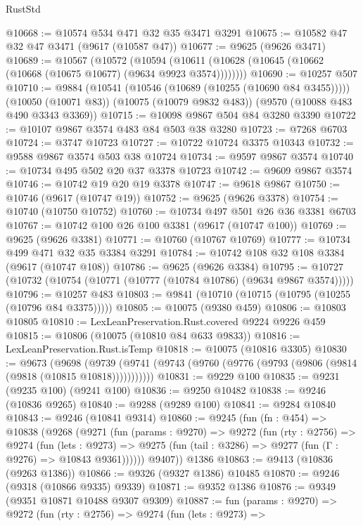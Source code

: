 \begin{lexlean}{RustStd}
\begin{coremodule}
@10668 := @10574 @534 @471 @32 @35 @3471 @3291
@10675 := @10582 @47 @32 @47 @3471 (@9617 (@10587 @47))
@10677 := @9625 (@9626 @3471)
@10689 := @10567
    (@10572
      (@10594 (@10611 (@10628 (@10645 (@10662 (@10668 (@10675 @10677) (@9634 @9923 @3574))))))))
@10690 := @10257 @507
@10710 := @9884
    (@10541 (@10546 (@10689 (@10255 (@10690 @84 @3455)))))
    (@10050 (@10071 @83))
    (@10075 (@10079 @9832 @483))
    (@9570 (@10088 @483 @490 @3343 @3369))
@10715 := @10098 @9867 @504 @84 @3280 @3390
@10722 := @10107 @9867 @3574 @483 @84 @503 @38 @3280
@10723 := @7268 @6703
@10724 := @3747 @10723
@10727 := @10722 @10724 @3375 @10343
@10732 := @9588 @9867 @3574 @503 @38 @10724
@10734 := @9597 @9867 @3574
@10740 := @10734 @495 @502 @20 @37 @3378 @10723
@10742 := @9609 @9867 @3574
@10746 := @10742 @19 @20 @19 @3378
@10747 := @9618 @9867
@10750 := @10746 (@9617 (@10747 @19))
@10752 := @9625 (@9626 @3378)
@10754 := @10740 (@10750 @10752)
@10760 := @10734 @497 @501 @26 @36 @3381 @6703
@10767 := @10742 @100 @26 @100 @3381 (@9617 (@10747 @100))
@10769 := @9625 (@9626 @3381)
@10771 := @10760 (@10767 @10769)
@10777 := @10734 @499 @471 @32 @35 @3384 @3291
@10784 := @10742 @108 @32 @108 @3384 (@9617 (@10747 @108))
@10786 := @9625 (@9626 @3384)
@10795 := @10727 (@10732 (@10754 (@10771 (@10777 (@10784 @10786) (@9634 @9867 @3574)))))
@10796 := @10257 @483
@10803 := @9841 (@10710 (@10715 (@10795 (@10255 (@10796 @84 @3375)))))
@10805 := @10075 (@9380 @459)
@10806 := @10803 @10805
@10810 := LexLeanPreservation.Rust.covered @9224 @9226 @459
@10815 := @10806 (@10075 (@10810 @84 @633 @9833))
@10816 := LexLeanPreservation.Rust.isTemp
@10818 := @10075 (@10816 @3305)
@10830 := @9673
    (@9698 (@9739 (@9741 (@9743 (@9760 (@9776 (@9793 (@9806 (@9814 (@9818 (@10815 @10818)))))))))))
@10831 := @9229 @100
@10835 := @9231 (@9235 @100) (@9241 @100)
@10836 := @9250 @10482
@10838 := @9246 (@10836 @9265)
@10840 := @9288 (@9289 @100)
@10841 := @9284 @10840
@10843 := @9246 (@10841 @9314)
@10860 := @9245
    (fun (fn : @454) =>
    @10838
      (@9268
        (@9271
          (fun (params : @9270) =>
          @9272
            (fun (rty : @2756) =>
            @9274
              (fun (lets : @9273) =>
              @9275 (fun (tail : @3286) => @9277 (fun (Γ : @9276) => @10843 @9361))))))
        @9407))
    @1386
@10863 := @9413 (@10836 (@9263 @1386))
@10866 := @9326 (@9327 @1386) @10485
@10870 := @9246 (@9318 (@10866 @9335) @9339)
@10871 := @9352 @1386
@10876 := @9349 (@9351 @10871 @10488 @9307 @9309)
@10887 := fun (params : @9270) =>
  @9272
    (fun (rty : @2756) =>
    @9274
      (fun (lets : @9273) =>

\end{coremodule}
\end{lexlean}
